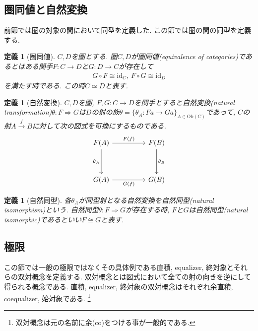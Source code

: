 \documentclass[a4paper,12pt]{ltjsarticle}
\theoremstyle{break}
\newtheorem{defn}[thm]{定義}
\newcommand{\Ob}{\mathrm{Ob}}
\newcommand{\xr}[1]{\xrightarrow{#1}}
\newcommand{\id}{\mathrm{id}}
\newcommand{\ci}{\circ}
\newcommand{\ra}{\Rightarrow}
\numberwithin{equation}{section}
\begin{document}
\subsection{圏同値と自然変換}

前節では圏の対象の間において同型を定義した. 
この節では圏の間の同型を定義する. 

\begin{defn}[圏同値]
  $C,D$を圏とする. 
  圏$C,D$が圏同値(equivalence of categories)であるとはある関手$F: C \to D$と$G: D \to C$が存在して
  \begin{align*}
  G \ci F \cong \id_C, ~F \ci G \cong \id_D
  \end{align*}
  を満たす時である. 
  この時$C \simeq D$と表す. 
\end{defn}

\begin{defn}[自然変換]
  $C, D$を圏, $F, G: C \to D$を関手とすると自然変換(natural transformation)$\theta: F \ra G$は$D$の射の族$\theta = \{ \theta_A: Fa \to Ga \}_{A \in \Ob(C)}$であって, $C$の射$A \xr{f} B$に対して次の図式を可換にするものである. 
  \[\begin{tikzcd}
	  {F(A)} && {F(B)} \\
	  \\
	  {G(A)} && {G(B)}
	  \arrow["{\theta_A}"', from=1-1, to=3-1]
	  \arrow["{F(f)}", from=1-1, to=1-3]
	  \arrow["{\theta_B}", from=1-3, to=3-3]
	  \arrow["{G(f)}"', from=3-1, to=3-3]
  \end{tikzcd}\]
\end{defn}

\begin{defn}[自然同型]
  各$\theta_A$が同型射となる自然変換を自然同型(natural isomorphism)という. 
  自然同型$\theta: F \ra G$が存在する時, $F$と$G$は自然同型(natural isomorphic)であるといい$F \cong G$と表す. 
\end{defn}

\subsection{極限}

この節では一般の極限ではなくその具体例である直積, equalizer, 終対象とそれらの双対概念を定義する. 
双対概念とは図式において全ての射の向きを逆にして得られる概念である. 
直積, equalizer, 終対象の双対概念はそれぞれ余直積, coequalizer, 始対象である.
\footnote{
  双対概念は元の名前に余(co)をつける事が一般的である.
  }
\end{document}
